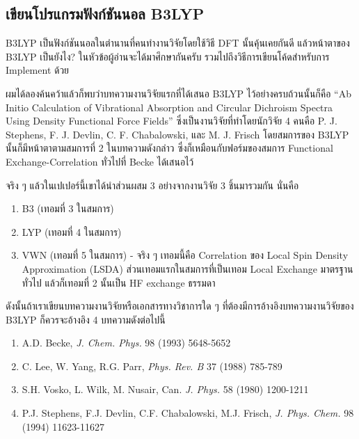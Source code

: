 \subsection{เขียนโปรแกรมฟังก์ชันนอล B3LYP}

B3LYP เป็นฟังก์ชันนอลในตำนานที่คนทำงานวิจัยโดยใช้วิธี DFT นั้นคุ้นเคยกันดี แล้วหน้าตาของ B3LYP เป็นยังไง? ในหัวข้อผู้อ่านจะได้มาศึกษากันครับ
รวมไปถึงวิธีการเขียนโค้ดสำหรับการ Implement ด้วย

ผมได้ลองค้นคว้าแล้วก็พบว่าบทความงานวิจัยแรกที่ได้เสนอ B3LYP ไว้อย่างครบถ้วนนั้นก็คือ \enquote{Ab Initio Calculation of Vibrational
Absorption and Circular Dichroism Spectra Using Density Functional Force Fields}\autocite{stephens1994} 
ซึ่งเป็นงานวิจัยที่ทำโดยนักวิจัย 4 คนคือ P. J. Stephens, F. J. Devlin, C. F. Chabalowski, และ M. J. Frisch โดยสมการของ 
B3LYP นั้นก็มีหน้าตาตามสมการที่ 2 ในบทความดังกล่าว ซึ่งก็เหมือนกับฟอร์มของสมการ Functional Exchange-Correlation ทั่วไปที่ Becke 
ได้เสนอไว้

จริง ๆ แล้วในเปเปอร์นี้เขาได้นำส่วนผสม 3 อย่างจากงานวิจัย 3 ชิ้นมารวมกัน นั่นคือ

\begin{enumerate}[topsep=0pt,noitemsep]
  \item B3 (เทอมที่ 3 ในสมการ)

  \item LYP (เทอมที่ 4 ในสมการ)

  \item VWN (เทอมที่ 5 ในสมการ) - จริง ๆ เทอมนี้คือ Correlation ของ Local Spin Density Approximation (LSDA)
        ส่วนเทอมแรกในสมการที่เป็นเทอม Local Exchange มาตรฐานทั่วไป แล้วก็เทอมที่ 2 นั้นเป็น HF exchange ธรรมดา
\end{enumerate}

ดังนั้นถ้าเราเขียนบทความงานวิจัยหรือเอกสารทางวิชาการใด ๆ ที่ต้องมีการอ้างอิงบทความงานวิจัยของ B3LYP ก็ควรจะอ้างอิง 4 บทความดังต่อไปนี้

\begin{enumerate}[topsep=0pt,noitemsep]
  \item A.D. Becke, \textit{J. Chem. Phys.} 98 (1993) 5648-5652

  \item C. Lee, W. Yang, R.G. Parr, \textit{Phys. Rev. B} 37 (1988) 785-789

  \item S.H. Vosko, L. Wilk, M. Nusair, Can. \textit{J. Phys.} 58 (1980) 1200-1211

  \item P.J. Stephens, F.J. Devlin, C.F. Chabalowski, M.J. Frisch, \textit{J. Phys. Chem.} 98 (1994) 11623-11627
\end{enumerate}


